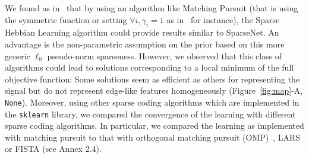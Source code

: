 \documentclass[draft]{article} %
\newcommand{\seeFig}[1]{Figure~\ref{fig:#1}}%
\begin{document}

We found as in~\citep{Rehn07} that by using an algorithm like Matching Pursuit (that is using the symmetric function or setting $\forall i, \gamma_i=1$ as in~\citep{Mairal14} for instance), the Sparse Hebbian Learning algorithm could provide results similar to {\sc SparseNet}. An advantage is the non-parametric assumption on the prior based on this more generic $\ell_0$ pseudo-norm sparseness. However, we observed that this class of algorithms could lead to solutions corresponding to a local minimum of the full objective function: Some solutions seem as efficient as others for representing the signal but do not represent edge-like features homogeneously (\seeFig{map}-A, \texttt{None}). %
Moreover, using other sparse coding algorithms which are implemented in the \verb+sklearn+ library, we compared the convergence of the learning with different sparse coding algorithms. In particular, we compared the learning as implemented with matching pursuit to that with orthogonal matching pursuit (OMP)~\citep{pati1993orthogonal}, LARS or FISTA (see Annex 2.4). %
\end{document}
